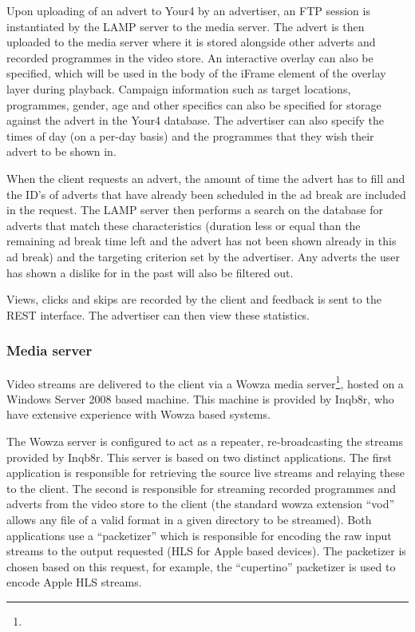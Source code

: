 Upon uploading of an advert to Your4 by an advertiser, an FTP session is instantiated by the LAMP server to the media server. The advert is then uploaded to the media server where it is stored alongside other adverts and recorded programmes in the video store. An interactive overlay can also be specified, which will be used in the body of the iFrame element of the overlay layer during playback. Campaign information such as target locations, programmes, gender, age and other specifics can also be specified for storage against the advert in the Your4 database. The advertiser can also specify the times of day (on a per-day basis) and the programmes that they wish their advert to be shown in.

When the client requests an advert, the amount of time the advert has to fill and the ID's of adverts that have already been scheduled in the ad break are included in the request. The LAMP server then performs a search on the database for adverts that match these characteristics (duration less or equal than the remaining ad break time left and the advert has not been shown already in this ad break) and the targeting criterion set by the advertiser. Any adverts the user has shown a dislike for in the past will also be filtered out.

Views, clicks and skips are recorded by the client and feedback is sent to the REST interface. The advertiser can then view these statistics.

\subsubsection{Media server}

Video streams are delivered to the client via a Wowza media server\footnote{}, hosted on a Windows Server 2008 based machine. This machine is provided by Inqb8r, who have extensive experience with Wowza based systems.

The Wowza server is configured to act as a repeater, re-broadcasting the streams provided by Inqb8r. This server is based on two distinct applications. The first application is responsible for retrieving the source live streams and relaying these to the client. The second is responsible for streaming recorded programmes and adverts from the video store to the client (the standard wowza extension ``vod'' allows any file of a valid format in a given directory to be streamed). Both applications use a ``packetizer'' which is responsible for encoding the raw input streams to the output requested (HLS for Apple based devices). The packetizer is chosen based on this request, for example, the ``cupertino'' packetizer is used to encode Apple HLS streams.

